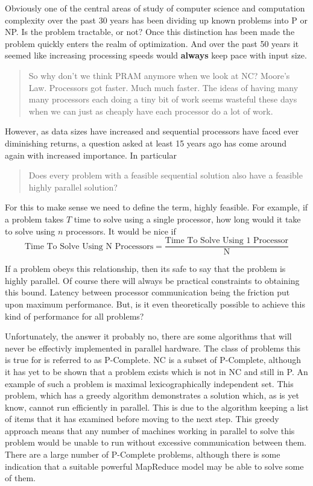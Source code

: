 \documentclass{article}
\begin{document}
Obviously one of the central areas of study of computer science and computation complexity over the past 30 years has been dividing up known problems into P or NP. Is the problem tractable, or not? Once this distinction has been made the problem quickly enters the realm of optimization. And over the past 50 years it seemed like increasing processing speeds would {\bf always} keep pace with input size. 

\begin{quotation}
So why don't we think PRAM anymore when we look at NC? Moore's Law. Processors got faster. Much much faster. The ideas of having many many processors each doing a tiny bit of work seems wasteful these days when we can just as cheaply have each processor do a lot of work. \cite{pramblog}
\end{quotation}

However, as data sizes have increased and sequential processors have faced ever diminishing returns, a question asked at least 15 years ago has come around again with increased importance. In particular

\begin{quotation}
Does every problem with a feasible sequential solution also have a feasible highly parallel solution? \cite{limits}
\end{quotation}

For this to make sense we need to define the term, highly feasible. For example, if a problem takes $T$ time to solve using a single processor, how long would it take to solve using $n$ processors. It would be nice if 
\[
\text{Time To Solve Using N Processors} = 
\frac{\text{Time To Solve Using 1 Processor}}{\text{N}}
\]

If a problem obeys this relationship, then its safe to say that the problem is highly parallel. Of course there will always be practical constraints to obtaining this bound. Latency between processor communication being the friction put upon maximum performance. But, is it even theoretically possible to achieve this kind of performance for all problems? 

Unfortunately, the answer it probably no, there are some algorithms that will never be effectivly implemented in parallel hardware. The class of problems this is true for is referred to as P-Complete. NC is a subset of P-Complete, although it has yet to be shown that a problem exists which is not in NC and still in P. An example of such a problem is maximal lexicographically independent set. This problem, which has a greedy algorithm demonstrates a solution which, as is yet know, cannot run efficiently in parallel. This is due to the algorithm keeping a list of items that it has examined before moving to the next step. This greedy approach means that any number of machines working in parallel to solve this problem would be unable to run without excessive communication between them. There are a large number of P-Complete problems, although there is some indication that a suitable powerful MapReduce model may be able to solve some of them. 
\end{document}
